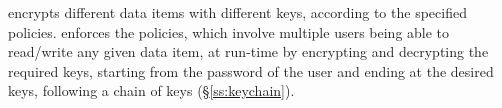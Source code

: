\name{} encrypts different data items with different keys, according
to the specified policies.  \name{} enforces the policies, which
involve multiple users being able to read/write any given data item,
at run-time by encrypting and decrypting the required keys, starting
from the password of the user and ending at the desired keys,
following a chain of keys (\S\ref{ss:keychain}).








